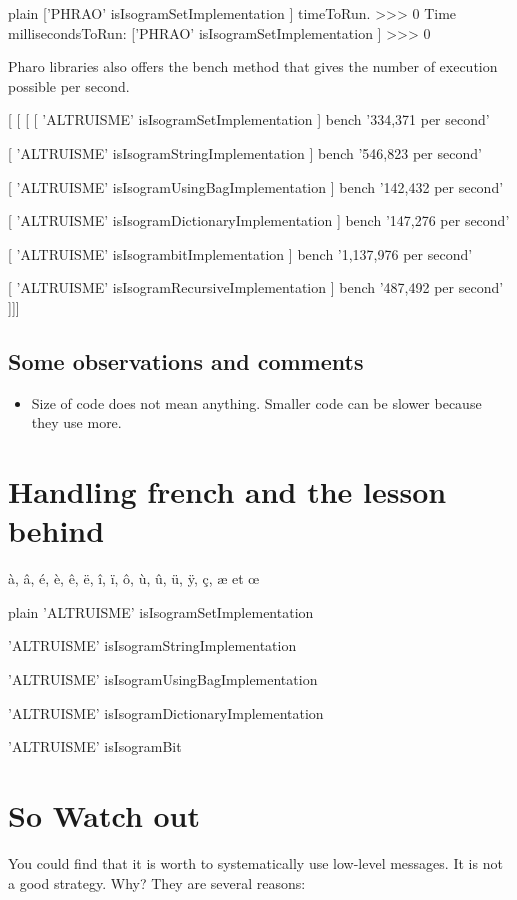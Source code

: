 \documentclass[10pt,twoside,english]{_support/latex/sbabook/sbabook}
\begin{document}
\begin{displaycode}{plain}
['PHRAO' isIsogramSetImplementation ] timeToRun.
>>> 0
Time millisecondsToRun: ['PHRAO' isIsogramSetImplementation ] 
>>> 0
\end{displaycode}

Pharo libraries also offers the bench method that gives the number of execution possible per second. 

{[} {[} {[} 
{[}  'ALTRUISME' isIsogramSetImplementation {]} bench  '334,371 per second'

{[}  'ALTRUISME' isIsogramStringImplementation {]} bench  '546,823 per second'

{[}  'ALTRUISME' isIsogramUsingBagImplementation {]} bench  '142,432 per second'

{[}  'ALTRUISME' isIsogramDictionaryImplementation {]} bench  '147,276 per second'

{[} 'ALTRUISME' isIsogrambitImplementation {]} bench  '1,137,976 per second'

{[}  'ALTRUISME' isIsogramRecursiveImplementation {]} bench '487,492 per second'
{]}{]}{]}
\subsection{Some observations and comments}\label{todo explain}
\begin{itemize}
\item Size of code does not mean anything. Smaller code can be slower because they use more. 
\end{itemize}
\section{Handling french and the lesson behind}
\`{a}, \^{a}, \'{e}, \`{e}, \^{e}, \"{e}, \^{i}, \"{i}, \^{o}, \`{u}, \^{u}, \"{u}, \"{y}, \c{c}, æ et œ

\begin{displaycode}{plain}
'ALTRUISME' isIsogramSetImplementation 

'ALTRUISME' isIsogramStringImplementation 

'ALTRUISME' isIsogramUsingBagImplementation

'ALTRUISME' isIsogramDictionaryImplementation

'ALTRUISME' isIsogramBit 
\end{displaycode}
\section{So  Watch out}
You could find that it is worth to systematically use low-level messages. It is not a good strategy.
Why? They are several reasons:
\end{document}
